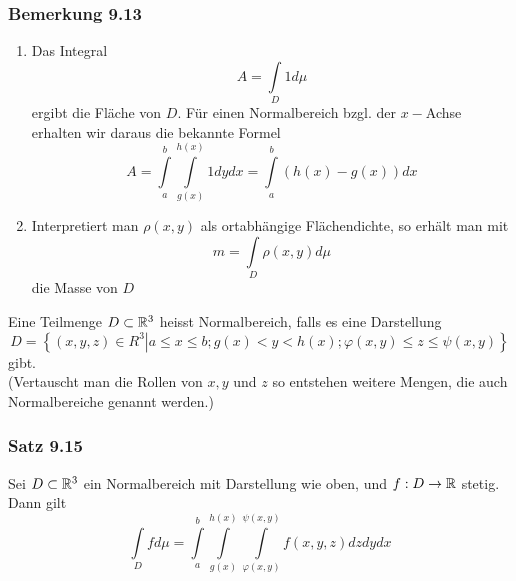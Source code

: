 \subsubsection*{Bemerkung 9.13}
\begin{enumerate}
\item Das Integral \[A = \int\limits_D {1d\mu } \] ergibt die Fläche von $D$. Für einen Normalbereich bzgl. der $x-$Achse erhalten wir daraus die bekannte Formel
\[A = \int\limits_a^b {\int\limits_{g(x)}^{h(x)} {1dydx} }  = \int\limits_a^b {\left( {h(x) - g(x)} \right)dx} \]

\begin{center}
\end{center}

\item Interpretiert man $\rho(x,y)$ als ortabhängige Flächendichte, so erhält man mit \[m = \int\limits_D {\rho \left( {x,y} \right)d\mu } \] die Masse von $D$
\end{enumerate}

\begin{definition}{9.14}
Eine Teilmenge $D\subset\mathbb{R}^3$ heisst Normalbereich, falls es eine Darstellung
\[D = \left\{ {\left. {\left( {x,y,z} \right) \in {R^3}} \right|a \le x \le b;g(x) < y < h(x);\varphi \left( {x,y} \right) \le z \le \psi \left( {x,y} \right)} \right\}\] gibt.\\

(Vertauscht man die Rollen von $x,y$ und $z$ so entstehen weitere Mengen, die auch Normalbereiche genannt werden.)
\end{definition}

\subsubsection*{Satz 9.15}
Sei $D\subset\mathbb{R}^3$ ein Normalbereich mit Darstellung wie oben, und $f:D\to\mathbb{R}$ stetig. Dann gilt \[\int\limits_D {fd\mu }  = \int\limits_a^b {\int\limits_{g(x)}^{h(x)} {\int\limits_{\varphi \left( {x,y} \right)}^{\psi \left( {x,y} \right)} {f\left( {x,y,z} \right)dzdydx} } } \]

